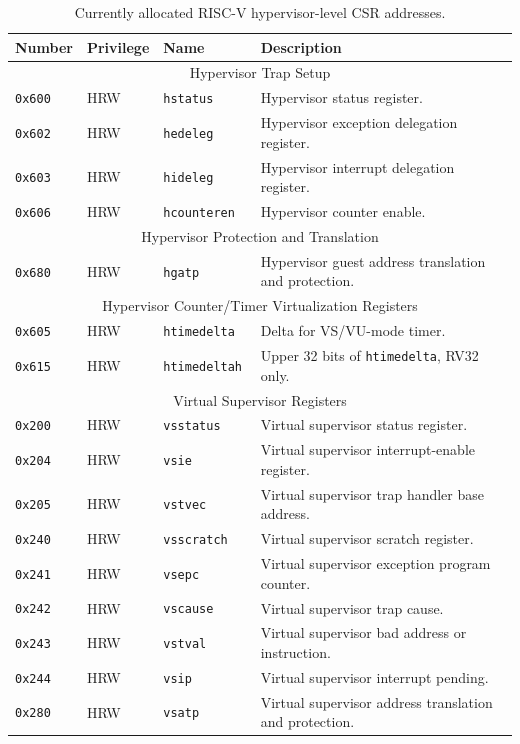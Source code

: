 \begin{table}[htb!]
\begin{center}
\begin{tabular}{|l|l|l|l|}
\hline
Number    & Privilege & Name & Description \\
\hline
\multicolumn{4}{|c|}{Hypervisor Trap Setup} \\
\hline
\hline
\tt 0x600 & HRW  &\tt hstatus    & Hypervisor status register. \\
\tt 0x602 & HRW  &\tt hedeleg    & Hypervisor exception delegation register. \\
\tt 0x603 & HRW  &\tt hideleg    & Hypervisor interrupt delegation register. \\
\tt 0x606 & HRW  &\tt hcounteren & Hypervisor counter enable. \\
\hline
\multicolumn{4}{|c|}{Hypervisor Protection and Translation} \\
\hline
\tt 0x680 & HRW  &\tt hgatp      & Hypervisor guest address translation and protection. \\
\hline
\multicolumn{4}{|c|}{Hypervisor Counter/Timer Virtualization Registers} \\
\hline
\tt 0x605 & HRW  &\tt htimedelta   & Delta for VS/VU-mode timer. \\
\tt 0x615 & HRW  &\tt htimedeltah  & Upper 32 bits of {\tt htimedelta}, RV32 only. \\
\hline
\multicolumn{4}{|c|}{Virtual Supervisor Registers} \\
\hline
\tt 0x200 & HRW  &\tt vsstatus   & Virtual supervisor status register. \\
\tt 0x204 & HRW  &\tt vsie       & Virtual supervisor interrupt-enable register. \\
\tt 0x205 & HRW  &\tt vstvec     & Virtual supervisor trap handler base address. \\
\tt 0x240 & HRW  &\tt vsscratch  & Virtual supervisor scratch register. \\
\tt 0x241 & HRW  &\tt vsepc      & Virtual supervisor exception program counter. \\
\tt 0x242 & HRW  &\tt vscause    & Virtual supervisor trap cause. \\
\tt 0x243 & HRW  &\tt vstval     & Virtual supervisor bad address or instruction. \\
\tt 0x244 & HRW  &\tt vsip       & Virtual supervisor interrupt pending. \\
\tt 0x280 & HRW  &\tt vsatp      & Virtual supervisor address translation and protection. \\
\hline
\end{tabular}
\end{center}
\caption{Currently allocated RISC-V hypervisor-level CSR addresses.}
\label{hcsrnames}
\end{table}


